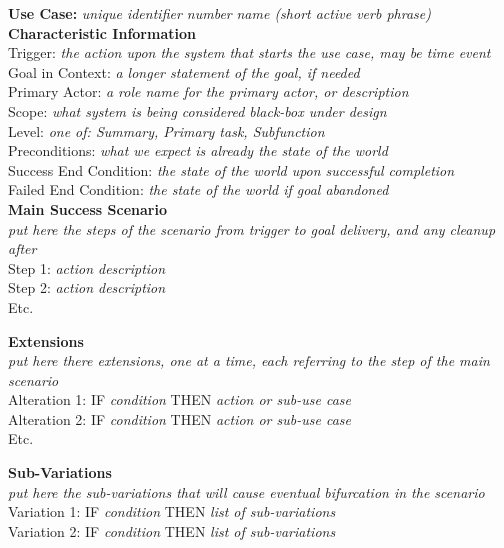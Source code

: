 {\bf Use Case:} {\it unique identifier number} {\it name (short active verb phrase)} \\

{\bf Characteristic Information} \\
Trigger: {\it the action upon the system that starts the use case, may be time event} \\
Goal in Context: {\it a longer statement of the goal, if needed} \\
Primary Actor: {\it a role name for the primary actor, or description} \\
Scope: {\it what system is being considered black-box under design} \\
Level: {\it one of: Summary, Primary task, Subfunction} \\
Preconditions: {\it what we expect is already the state of the world} \\
Success End Condition: {\it the state of the world upon successful completion} \\
Failed End Condition: {\it the state of the world if goal abandoned} \\

{\bf Main Success Scenario} \\
{\it put here the steps of the scenario from trigger to goal delivery, and any cleanup after} \\
Step 1: {\it action description} \\
Step 2: {\it action description} \\
Etc.

{\bf Extensions} \\
{\it put here there extensions, one at a time, each referring to the step of the main scenario} \\
Alteration 1: IF {\it condition} THEN {\it action or sub-use case} \\
Alteration 2: IF {\it condition} THEN {\it action or sub-use case} \\
Etc.

{\bf Sub-Variations} \\
{\it put here the sub-variations that will cause eventual bifurcation in the scenario} \\
Variation 1: IF {\it condition} THEN {\it list of sub-variations} \\
Variation 2: IF {\it condition} THEN {\it list of sub-variations} \\

